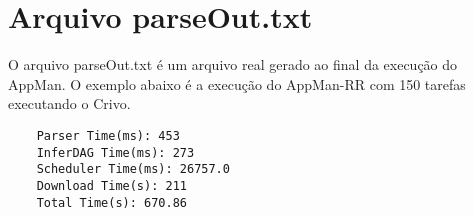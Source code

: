 \chapter{Arquivo parseOut.txt}
\label{anexo:parser}

O arquivo parseOut.txt é um arquivo real gerado ao final da execução do AppMan. O exemplo abaixo é a execução do AppMan-RR com 150 tarefas executando o Crivo.

\begin{scriptsize}
\begin{verbatim}
	Parser Time(ms): 453
	InferDAG Time(ms): 273
	Scheduler Time(ms): 26757.0
	Download Time(s): 211
	Total Time(s): 670.86
\end{verbatim}
\end{scriptsize}